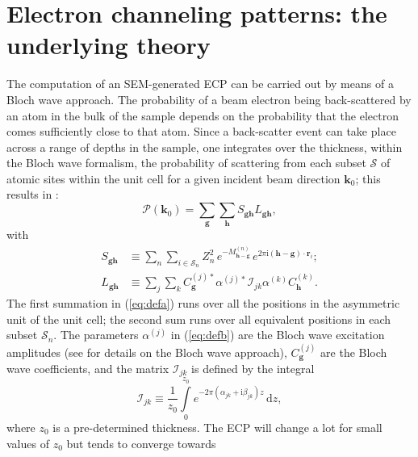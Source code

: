 \documentclass[DIV=calc, paper=letter, fontsize=11pt]{scrartcl}	 %
\begin{document}
\section{Electron channeling patterns: the underlying theory\label{sec:theory}}
The computation of an SEM-generated ECP can be carried out by means of a Bloch wave approach. The probability
of a beam electron being back-scattered by an atom in the bulk of the sample depends on the probability that the electron
comes sufficiently close to that atom.  Since a back-scatter event can take place across a range of depths in the sample, one 
integrates over the thickness, within the Bloch wave formalism, the probability of scattering from each subset $\mathcal{S}$ of atomic sites within the 
unit cell for a given incident beam direction $\mathbf{k}_0$; this results in \parencite{winkelmann2003a,winkelmann2008a}:
\begin{equation}
	\mathcal{P}(\mathbf{k}_0) = \sum_{\mathbf{g}} 
    \sum_{\mathbf{h}} S_{\mathbf{g}\mathbf{h}}L_{\mathbf{g}\mathbf{h}},
    \label{eq:prob}
\end{equation}
with
\begin{subequations}
\begin{align}
    S_{\mathbf{g}\mathbf{h}} &\equiv \sum_{n}\sum_{i\in\mathcal{S}_n} Z^2_n\,e^{-M^{(n)}_{\mathbf{h}-\mathbf{g}}}\,e^{2\pi\mathrm{i} 
    (\mathbf{h}-\mathbf{g})\cdot\mathbf{r}_{i}};\label{eq:defa}\\
    L_{\mathbf{g}\mathbf{h}} &\equiv \sum_{j}\sum_{k} 
    C^{(j)\ast}_{\mathbf{g}}\alpha^{(j)\ast}\mathcal{I}_{jk}\alpha^{(k)}
    C^{(k)}_{\mathbf{h}}.\label{eq:defb}
\end{align}
\end{subequations}
The first summation in (\ref{eq:defa}) runs over all the positions in the asymmetric unit of the unit cell; the second
sum runs over all equivalent positions in each subset $\mathcal{S}_n$.
The parameters $\alpha^{(j)}$ in (\ref{eq:defb}) are the Bloch wave excitation amplitudes (see \parencite{humphreys1979a,degraef2003b} for 
details on the Bloch wave approach), $C_{\mathbf{g}}^{(j)}$ are the 
Bloch wave coefficients, and the matrix $\mathcal{I}_{jk}$ is defined by the integral
\begin{equation}
	\mathcal{I}_{jk}\equiv \frac{1}{z_{0}}\int\limits_{0}^{z_{0}} 
    e^{-2\pi(\alpha_{jk}+\mathrm{i}\beta_{jk})z}\,\mathrm{d}z,
\end{equation}
where $z_0$ is a pre-determined thickness.  The ECP will change a lot for small values of $z_0$ but tends to converge towards 
\end{document}
